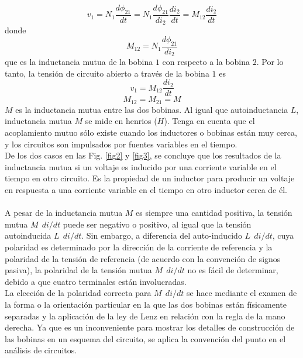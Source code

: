 \documentclass[twocolumn]{IEEEtran}
\begin{document}
\begin{equation}
 v_1 = N_1 \frac{d \phi _{21}}{d t} = N_1 \frac{d \phi _{21}}{d i_2} \frac{d i_2}{d t} = M_{12} \frac{d i_2}{d t}
\label{ecu13}
\end{equation}
\noindent
donde
\begin{equation}
 M_{12} = N_1 \frac{d \phi _{21}}{d i_2}
\label{ecu14}
\end{equation}
\noindent
que es la inductancia mutua de la bobina $1$ con respecto a la bobina $2$. Por lo tanto, la tensión de circuito abierto a través de la bobina $1$ es
\begin{equation}
 v_1 = M_{12} \frac{d i_2}{d t}
\label{ecu15}
\end{equation}
\begin{equation}
 M_{12} = M_{21} = M
\label{ecu16}
\end{equation}
\noindent
$M$ es la inductancia mutua entre las dos bobinas. Al igual que autoinductancia $L$, inductancia mutua $M$ se mide en henrios ($H$). Tenga en cuenta que el acoplamiento mutuo sólo existe cuando los inductores o bobinas están muy cerca, y los circuitos son impulsados ​​por fuentes variables en el tiempo.\\
De los dos casos en las Fig. \ref{fig2} y \ref{fig3}, se concluye que los resultados de la inductancia mutua si un voltaje es inducido por una corriente variable en el tiempo en otro circuito. Es la propiedad de un inductor para producir un voltaje en respuesta a una corriente variable en el tiempo en otro inductor cerca de él.\\\\
A pesar de la inductancia mutua $M$ es siempre una cantidad positiva, la tensión mutua $M\ \ di / dt$ puede ser negativo o positivo, al igual que la tensión autoinducida $L\ \ di / dt$. Sin embargo, a diferencia del auto-inducido $L\ \ di/ dt$, cuya polaridad es determinado por la dirección de la corriente de referencia y la polaridad de la tensión de referencia (de acuerdo con la convención de signos pasiva), la polaridad de la tensión mutua $M\ \ di / dt$ no es fácil de determinar, debido a que cuatro terminales están involucradas.\\
La elección de la polaridad correcta para $M\ \  di / dt$ se hace mediante el examen de la forma o la orientación particular en la que las dos bobinas están físicamente separadas y la aplicación de la ley de Lenz en relación con la regla de la mano derecha. Ya que es un inconveniente para mostrar los detalles de construcción de las bobinas en un esquema del circuito, se aplica la convención del punto en el análisis de circuitos.\\
\end{document}
